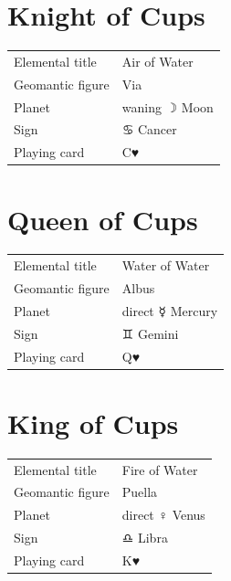 \newpage
\section*{Knight of Cups}

\begin{center}
\end{center}

\vspace{4mm}
\noindent\begin{tabular}{@{}l@{\quad}l@{}}
Elemental title & Air of Water \\
Geomantic figure & Via \\
Planet & waning {\symbfont ☽} Moon \\
Sign & {\symbfont ♋} Cancer \\
Playing card & C♥ \\
\end{tabular}

\newpage
\section*{Queen of Cups}

\begin{center}
\end{center}

\vspace{4mm}
\noindent\begin{tabular}{@{}l@{\quad}l@{}}
Elemental title & Water of Water \\
Geomantic figure & Albus \\
Planet & direct {\symbfont ☿} Mercury \\
Sign & {\symbfont ♊} Gemini \\
Playing card & Q♥ \\
\end{tabular}

\newpage
\section*{King of Cups}

\begin{center}
\end{center}

\vspace{4mm}
\noindent\begin{tabular}{@{}l@{\quad}l@{}}
Elemental title & Fire of Water \\
Geomantic figure & Puella \\
Planet & direct {\symbfont ♀} Venus \\
Sign & {\symbfont ♎} Libra \\
Playing card & K♥ \\
\end{tabular}

